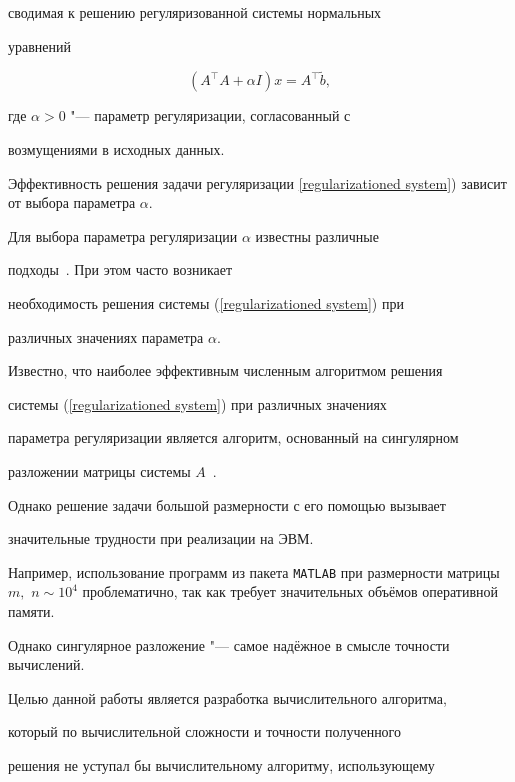 сводимая к решению регуляризованной системы нормальных

уравнений

\begin{equation}

\label{regularizationed system} \left( A^\top    A + \alpha I \right) x = A^\top    \widetilde{b},

\end{equation}

где $\alpha > 0$ "--- параметр регуляризации, согласованный с

возмущениями в исходных данных.



Эффективность решения задачи регуляризации \eqref{regularizationed system}) зависит от выбора параметра $\alpha$. 

Для выбора параметра регуляризации $\alpha$ известны различные

подходы~{\cite{dolishzhdanov:bib:morozov}}. При этом часто возникает

необходимость решения системы (\ref{regularizationed system}) при

различных значениях параметра $\alpha$.



Известно, что наиболее эффективным численным алгоритмом решения

системы (\ref{regularizationed system}) при различных значениях

параметра регуляризации является алгоритм, основанный на сингулярном

разложении матрицы системы $A$~{\cite{dolishzhdanov:bib:chung}}.

Однако решение задачи большой размерности с его помощью вызывает

значительные трудности при реализации на ЭВМ. 

Например, использование программ из пакета {\tt MATLAB} при размерности матрицы $m,$ $n \sim 10^4$ проблематично, так как требует значительных объёмов оперативной памяти. 

Однако сингулярное разложение "--- самое надёжное в смысле точности вычислений.



Целью данной работы является разработка вычислительного алгоритма,

который по вычислительной сложности и точности полученного

решения не уступал бы  вычислительному алгоритму, использующему

